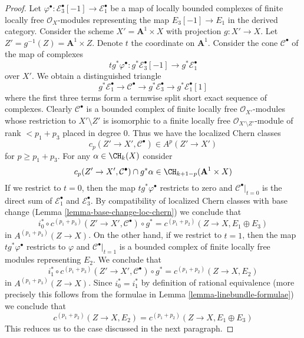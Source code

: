\begin{proof}
\medskip\noindent
Let $\varphi^\bullet : \mathcal{E}_3^\bullet[-1] \to \mathcal{E}_1^\bullet$
be a map of locally bounded complexes of finite locally free
$\mathcal{O}_X$-modules representing the map $E_3[-1] \to E_1$
in the derived category. Consider the scheme
$X' = \mathbf{A}^1 \times X$ with projection
$g : X' \to X$. Let $Z' = g^{-1}(Z) = \mathbf{A}^1 \times Z$.
Denote $t$ the coordinate on $\mathbf{A}^1$. Consider the cone
$\mathcal{C}^\bullet$ of the map of complexes
$$
t g^*\varphi^\bullet :
g^*\mathcal{E}_3^\bullet[-1]
\longrightarrow
g^*\mathcal{E}_1^\bullet
$$
over $X'$. We obtain a distinguished triangle
$$
g^*\mathcal{E}_1^\bullet \to \mathcal{C}^\bullet \to
g^*\mathcal{E}_3^\bullet \to g^*\mathcal{E}_1^\bullet[1]
$$
where the first three terms form a termwise split short exact
sequence of complexes. Clearly $\mathcal{C}^\bullet$ is a
bounded complex of finite locally free $\mathcal{O}_{X'}$-modules
whose restriction to $X' \setminus Z'$ is isomorphic to a
finite locally free
$\mathcal{O}_{X' \setminus Z'}$-module of rank $< p_1 + p_3$
placed in degree $0$. Thus we have the localized Chern classes
$$
c_p(Z' \to X', \mathcal{C}^\bullet) \in A^p(Z' \to X')
$$
for $p \geq p_1 + p_3$. For any $\alpha \in \CH_k(X)$ consider
$$
c_p(Z' \to X', \mathcal{C}^\bullet) \cap g^*\alpha
\in \CH_{k + 1 - p}(\mathbf{A}^1 \times X)
$$
If we restrict to $t = 0$, then the map $t g^*\varphi^\bullet$
restricts to zero and $\mathcal{C}^\bullet|_{t = 0}$
is the direct sum of $\mathcal{E}_1^\bullet$ and $\mathcal{E}_3^\bullet$.
By compatibility of localized Chern classes with base change
(Lemma \ref{lemma-base-change-loc-chern}) we conclude that
$$
i_0^* \circ c^{(p_1 + p_3)}(Z' \to X', \mathcal{C}^\bullet) \circ g^* =
c^{(p_1 + p_2)}(Z \to X, E_1 \oplus E_3)
$$
in $A^{(p_1 + p_3)}(Z \to X)$. On the other hand, if we restrict to $t = 1$,
then the map $t g^*\varphi^\bullet$
restricts to $\varphi$ and $\mathcal{C}^\bullet|_{t = 1}$
is a bounded complex of finite locally free modules representing $E_2$.
We conclude that
$$
i_1^* \circ c^{(p_1 + p_3)}(Z' \to X', \mathcal{C}^\bullet) \circ g^* =
c^{(p_1 + p_2)}(Z \to X, E_2)
$$
in $A^{(p_1 + p_3)}(Z \to X)$. Since $i_0^* = i_1^*$ by definition of
rational equivalence (more precisely this follows from the formulae in
Lemma \ref{lemma-linebundle-formulae}) we conclude that
$$
c^{(p_1 + p_2)}(Z \to X, E_2) = c^{(p_1 + p_2)}(Z \to X, E_1 \oplus E_3)
$$
This reduces us to the case discussed in the next paragraph.


\end{proof}
